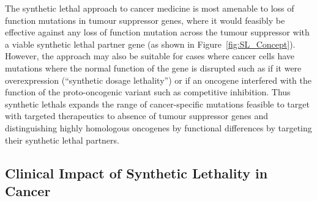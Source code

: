The \gls{synthetic lethal} approach to cancer medicine is most amenable to loss of function mutations in tumour suppressor genes, where it would feasibly be effective against any loss of function mutation across the tumour suppressor with a viable \gls{synthetic lethal} partner gene (as shown in Figure~\ref{fig:SL_Concept}). However, the approach may also be suitable for cases where cancer cells have mutations where the normal function of the gene is disrupted such as if it were overexpression (``synthetic dosage lethality'') or if an oncogene interfered with the function of the proto-oncogenic variant such as competitive inhibition. Thus \glspl{synthetic lethal} expands the range of cancer-specific mutations feasible to target with targeted therapeutics to absence of tumour suppressor genes and distinguishing highly homologous oncogenes by functional differences by targeting their \gls{synthetic lethal} partners. 

\subsection{Clinical Impact of Synthetic Lethality in Cancer}



